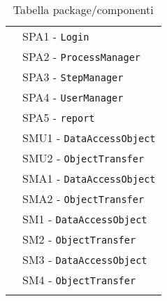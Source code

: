 \begin{longtable}{XX}
\midrule
\sLogicAdmin{}&SPA1 - \texttt{Login}\\
&SPA2 - \texttt{ProcessManager}\\
&SPA3 - \texttt{StepManager}\\
&SPA4 - \texttt{UserManager}\\
&SPA5 - \texttt{report}\\
\midrule
\daoUser{}&SMU1 - \texttt{DataAccessObject}\\
&SMU2 - \texttt{ObjectTransfer}\\
\midrule
\daoAdmin{}&SMA1 - \texttt{DataAccessObject}\\
&SMA2 - \texttt{ObjectTransfer}\\
\midrule
\daoProcess{}&SM1 - \texttt{DataAccessObject}\\
&SM2 - \texttt{ObjectTransfer}\\
\midrule
\daoStep{}&SM3 - \texttt{DataAccessObject}\\
&SM4 - \texttt{ObjectTransfer}\\
\bottomrule
\caption{Tabella package/componenti}
\end{longtable}

